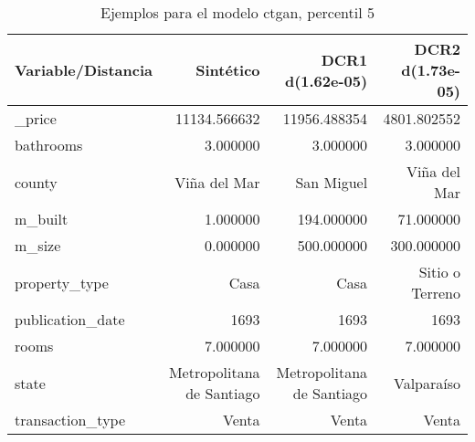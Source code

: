 \begin{table}[H]
\centering
\fontsize{10}{14}\selectfont
\caption{Ejemplos para el modelo ctgan, percentil 5}
\label{table-example-economicos-a-2-ctgan-5p}
\begin{tabular}{|l|r|r|r|}
\hline
\rowcolor[gray]{0.8}
Variable/Distancia & Sintético & DCR1 d(1.62e-05) & DCR2 d(1.73e-05) \\
\hline \_price & \cellcolor[rgb]{0.9, 0.54, 0.52} 11134.566632 & 11956.488354 & 4801.802552 \\
\hline bathrooms & \cellcolor[rgb]{0.9, 0.54, 0.52} 3.000000 & \cellcolor[rgb]{0.9, 0.54, 0.52} 3.000000 & \cellcolor[rgb]{0.9, 0.54, 0.52} 3.000000 \\
\hline county & \cellcolor[rgb]{0.9, 0.54, 0.52} Viña del Mar & San Miguel & \cellcolor[rgb]{0.9, 0.54, 0.52} Viña del Mar \\
\hline m\_built & \cellcolor[rgb]{0.9, 0.54, 0.52} 1.000000 & 194.000000 & 71.000000 \\
\hline m\_size & \cellcolor[rgb]{0.9, 0.54, 0.52} 0.000000 & 500.000000 & 300.000000 \\
\hline property\_type & \cellcolor[rgb]{0.9, 0.54, 0.52} Casa & \cellcolor[rgb]{0.9, 0.54, 0.52} Casa & Sitio o Terreno \\
\hline publication\_date & \cellcolor[rgb]{0.9, 0.54, 0.52} 1693 & \cellcolor[rgb]{0.9, 0.54, 0.52} 1693 & \cellcolor[rgb]{0.9, 0.54, 0.52} 1693 \\
\hline rooms & \cellcolor[rgb]{0.9, 0.54, 0.52} 7.000000 & \cellcolor[rgb]{0.9, 0.54, 0.52} 7.000000 & \cellcolor[rgb]{0.9, 0.54, 0.52} 7.000000 \\
\hline state & \cellcolor[rgb]{0.9, 0.54, 0.52} Metropolitana de Santiago & \cellcolor[rgb]{0.9, 0.54, 0.52} Metropolitana de Santiago & Valparaíso \\
\hline transaction\_type & \cellcolor[rgb]{0.9, 0.54, 0.52} Venta & \cellcolor[rgb]{0.9, 0.54, 0.52} Venta & \cellcolor[rgb]{0.9, 0.54, 0.52} Venta \\
\hline
\end{tabular}
\end{table}
